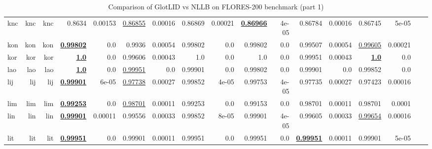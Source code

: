 \documentclass[11pt]{article}
\def\flores{FLORES\xspace}
\def\nllb{NLLB\xspace}
\begin{document}
\begin{table*}[h]
{\begin{tabular}{lrrrrrrrrrrrrrrrr}
knc         & knc         & knc         & 0.8634         & 0.00153         & \underline{0.86855}         & 0.00016         & 0.86869         & 0.00021         & \textbf{\underline{0.86966}}         & 4e-05         & 0.86784         & 0.00016         & 0.86745         & 5e-05         \\
kon         & kon         & kon         & \textbf{\underline{0.99802}}         & 0.0         & 0.9936         & 0.00054         & 0.99802         & 0.0         & 0.99802         & 0.0         & 0.99507         & 0.00054         & \underline{0.99605}         & 0.00021         \\
kor         & kor         & kor         & \textbf{\underline{1.0}}         & 0.0         & 0.99606         & 0.00043         & 1.0         & 0.0         & 1.0         & 0.0         & 0.99951         & 0.00043         & \textbf{\underline{1.0}}         & 0.0         \\
lao         & lao         & lao         & \textbf{\underline{1.0}}         & 0.0         & \underline{0.99951}         & 0.0         & 0.99901         & 0.0         & 0.99802         & 0.0         & 0.99901         & 0.0         & 0.99852         & 0.0         \\
lij         & lij         & lij         & \textbf{\underline{0.99901}}         & 6e-05         & \underline{0.97738}         & 0.00027         & 0.99852         & 4e-05         & 0.99753         & 4e-05         & 0.97735         & 0.00027         & 0.97423         & 0.00016         \\
lim         & lim         & lim         & \textbf{\underline{0.99253}}         & 0.0         & \underline{0.98701}         & 0.00011         & 0.99253         & 0.0         & 0.99153         & 0.0         & 0.98701         & 0.00011         & 0.98701         & 0.0001         \\
lin         & lin         & lin         & \textbf{\underline{0.99901}}         & 0.00011         & 0.99556         & 0.00033         & 0.99852         & 8e-05         & 0.99901         & 4e-05         & 0.99605         & 0.00033         & \underline{0.99654}         & 0.00016         \\
lit         & lit         & lit         & \textbf{\underline{0.99951}}         & 0.0         & 0.99901         & 0.00011         & 0.99951         & 0.0         & 0.99951         & 0.0         & \textbf{\underline{0.99951}}         & 0.00011         & 0.99901         & 5e-05         \\
\end{tabular}
}
\caption{Comparison of GlotLID vs \nllb on \flores-200 benchmark (part 1)}
\label{tab:appendix_glotlid_nllb_floress_1}
\end{table*}
\end{document}
